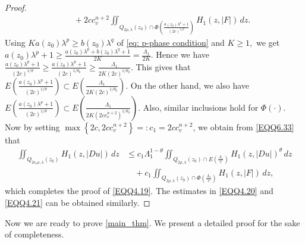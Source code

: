 \documentclass[11pt,oneside, english,reqno,twoside a4paper]{amsart}
\newtheorem{theorem}{Theorem}[section]
\theoremstyle{definition}
\numberwithin{theorem}{section}
\numberwithin{equation}{section}
\newcommand{\iintss}{{\int\hspace{-0.28cm}\int}}
\newcommand{ \miints }{{\iintss\hspace{-0.56cm} -\hspace{-0.15cm}-}}
\newcommand{\miint}[1]{{\miints_{\hspace{-0.13cm}#1}}}
\begin{document}
\begin{proof}
\begin{align}
    &\quad +2c c^{n+2}_v \iint_{Q_{2\rho, \lambda}(z_0) \cap \Phi\left({\frac{a(z_0)\lambda^p+1}{(2c)^{1/\theta}}}\right)} H_1(z, |F|)\, dz.
\end{align}
Using $Ka(z_0)\lambda^p\geq b(z_0)\lambda^q$ of \eqref{eq: p-phase condition} and $K\geq 1,$ we get $a(z_0)\lambda^p+1 \geq \frac{a(z_0)\lambda^p+b(z_0)\lambda^q+1}{2K}=\frac{\Lambda_1}{2K}.$ Hence we have $\frac{a(z_0)\lambda^p+1}{(2c)^{1/\theta}}\geq \frac{a(z_0)\lambda^p+1}{(2c)^{1/ \theta_0}} \geq \frac{\Lambda_1}{2K(2c)^{1/ \theta_0}}.$ This gives that $E\left({\frac{a(z_0)\lambda^p+1}{(2c)^{1/\theta}}}\right) \subset E\left({\frac{\Lambda_1}{2K(2c)^{1/\theta_0}}}\right).$ On the other hand, we also have $E\left({\frac{a(z_0)\lambda^p+1}{(2c)^{1/\theta}}}\right) \subset E\left(\frac{\Lambda_1}{2K(2c c^{n+2}_v)^{1/\theta_0}}\right).$ Also, similar inclusions hold for $\Phi(\cdot).$ Now by setting $\max\left\{2c, 2cc^{n+2}_v\right\}=:c_1=2cc^{n+2}_v$, we obtain from \eqref{EQQ6.33} that
\begin{align*}
\iint_{Q_{2c_v\rho, \lambda}(z_0)}H_1(z, |D u|)\, dz &\leq c_1\Lambda_1^{1-\theta}\iint_{Q_{2\rho, \lambda}(z_0) \cap E\left(\frac{\Lambda_1}{c}\right)} H_1(z, |D u|)^\theta\, dz\nonumber\\
&\quad + c_1\iint_{Q_{2\rho, \lambda}(z_0)\cap \Phi \left(\frac{\Lambda_1}{c}\right)} H_1(z, |F|)\,dz,
\end{align*}
which completes the proof of \eqref{EQQ4.19}. The estimates in \eqref{EQQ4.20} and \eqref{EQQ4.21} can be obtained similarly.
\end{proof}
Now we are ready to prove \cref{main_thm}. We present a detailed proof for the sake of completeness.
\end{document}
